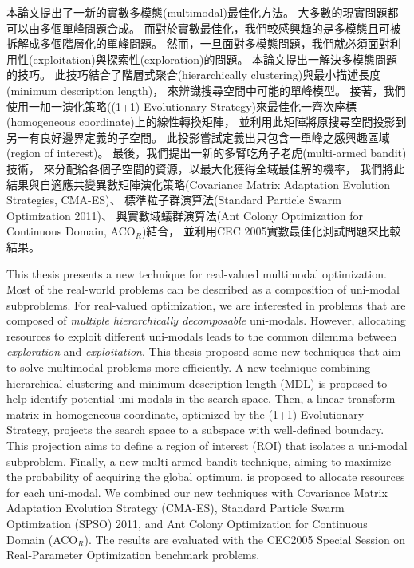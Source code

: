 \begin{abstractzh}
本論文提出了一新的實數多模態(multimodal)最佳化方法。
大多數的現實問題都可以由多個單峰問題合成。
而對於實數最佳化，我們較感興趣的是多模態且可被拆解成多個階層化的單峰問題。
然而，一旦面對多模態問題，我們就必須面對利用性(exploitation)與探索性(exploration)的問題。
本論文提出一解決多模態問題的技巧。
此技巧結合了階層式聚合(hierarchically clustering)與最小描述長度(minimum description length)， 來辨識搜尋空間中可能的單峰模型。
接著，我們使用一加一演化策略((1+1)-Evolutionary Strategy)來最佳化一齊次座標(homogeneous coordinate)上的線性轉換矩陣，
並利用此矩陣將原搜尋空間投影到另一有良好邊界定義的子空間。
此投影嘗試定義出只包含一單峰之感興趣區域(region of interest)。
最後，我們提出一新的多臂吃角子老虎(multi-armed bandit)技術，
來分配給各個子空間的資源，以最大化獲得全域最佳解的機率，
我們將此結果與自適應共變異數矩陣演化策略(Covariance Matrix Adaptation Evolution Strategies, CMA-ES)、
標準粒子群演算法(Standard Particle Swarm Optimization 2011)、
與實數域蟻群演算法(Ant Colony Optimization for Continuous Domain, ACO$_R$)結合，
並利用CEC 2005實數最佳化測試問題來比較結果。
\end{abstractzh}

\begin{abstracten}
This thesis presents a new technique for real-valued multimodal optimization.
Most of the real-world problems can be described as a composition of uni-modal subproblems.
For real-valued optimization, we are interested in problems that are composed of \textit{multiple hierarchically decomposable} uni-modals.
However, allocating resources to exploit different uni-modals leads to the 
common dilemma between \textit{exploration} and \textit{exploitation}.
This thesis proposed some new techniques that aim to solve multimodal problems more efficiently.
A new technique combining hierarchical clustering and minimum description length (MDL) 
is proposed to help identify potential uni-modals in the search space.
Then, a linear transform matrix in homogeneous coordinate, optimized by the (1+1)-Evolutionary Strategy,
projects the search space to a subspace with well-defined boundary.
This projection aims to define a region of interest (ROI) that isolates a uni-modal subproblem.
Finally, a new multi-armed bandit technique, aiming to maximize the probability of acquiring the global optimum,
is proposed to allocate resources for each uni-modal.
We combined our new techniques with Covariance Matrix Adaptation Evolution Strategy (CMA-ES), 
Standard Particle Swarm Optimization (SPSO) 2011, and Ant Colony Optimization for Continuous Domain (ACO$_R$).
The results are evaluated with the CEC2005 Special Session on Real-Parameter Optimization benchmark problems.
\end{abstracten}

